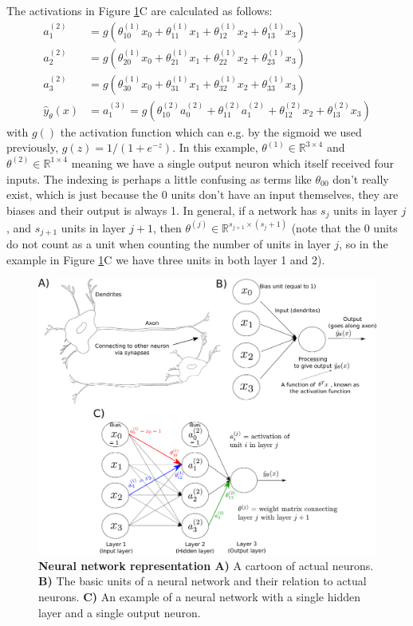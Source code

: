 \documentclass[a4paper, 10pt,hidelinks]{article}
\newcommand{\ind}[1]{^{(#1)}}
\begin{document}
The activations in Figure \ref{Fig: Neuron}C are calculated as follows:
\begin{align}
a\ind{2}_1 &= g(\theta\ind{1}_{10} x_0 + \theta\ind{1}_{11} x_1 + \theta\ind{1}_{12} x_2 + \theta\ind{1}_{13} x_3) \nonumber \\
a\ind{2}_2 &= g(\theta\ind{1}_{20} x_0 + \theta\ind{1}_{21} x_1 + \theta\ind{1}_{22} x_2 + \theta\ind{1}_{23} x_3) \nonumber \\
a\ind{2}_3 &= g(\theta\ind{1}_{30} x_0 + \theta\ind{1}_{31} x_1 + \theta\ind{1}_{32} x_2 + \theta\ind{1}_{33} x_3) \nonumber \\
\hat{y}_{\theta}(x) &= a\ind{3}_1 = g(\theta\ind{2}_{10} a\ind{2}_0 + \theta\ind{2}_{11} a\ind{2}_1 + \theta\ind{2}_{12} x_2 + \theta\ind{2}_{13} x_3) 
\end{align}
with $g()$ the activation function which can e.g. by the sigmoid we used previously, $g(z) = 1/(1 + e^{-z})$. In this example, $\theta\ind{1} \in \mathbb{R}^{3 \times 4}$ and $\theta\ind{2} \in \mathbb{R}^{1 \times 4}$ meaning we have a single output neuron which itself received four inputs. The indexing is perhaps a little confusing as terms like $\theta_{00}$ don't really exist, which is just because the $0$ units don't have an input themselves, they are biases and their output is always 1. 
In general, if a network has $s_j$ units in layer $j$, and $s_{j+1}$ units in layer $j + 1$, then $\theta\ind{j} \in \mathbb{R}^{s_{j + 1} \times (s_j + 1)}$ (note that the $0$ units do not count as a unit when counting the number of units in layer $j$, so in the example in Figure \ref{Fig: Neuron}C we have three units in both layer 1 and 2).

\begin{figure}[h!]
\includegraphics[width=0.9\linewidth]{NeuralNetwork}
\caption{\footnotesize{\textbf{Neural network representation A)} A cartoon of actual neurons. \textbf{B)} The basic units of a neural network and their relation to actual neurons. \textbf{C)} An example of a neural network with a single hidden layer and a single output neuron. }}
\label{Fig: Neuron}
\end{figure}
\end{document}
